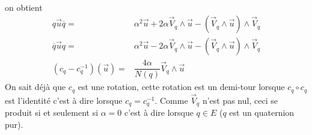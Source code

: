 \begin{enumerate}
\begin{align*}
\end{align*}
on obtient
\begin{align*}
 q\overrightarrow u \overline{q} =&
\alpha^2 \overrightarrow u + 2\alpha \overrightarrow V_q \wedge \overrightarrow u -(\overrightarrow V_q \wedge \overrightarrow u)\wedge \overrightarrow V_q \\
 \overline{q}\overrightarrow u q =&
\alpha^2 \overrightarrow u - 2\alpha \overrightarrow V_q \wedge \overrightarrow u -(\overrightarrow V_q \wedge \overrightarrow u)\wedge \overrightarrow V_q \\
(c_q-c_q^{-1})(\overrightarrow u) =& \dfrac{4\alpha}{N(q)} \overrightarrow V_q\wedge \overrightarrow u
\end{align*}
On sait déjà que $c_q$ est une rotation, cette rotation est un demi-tour lorsque $c_q\circ c_q$ est l'identité c'est à dire lorsque $c_q = c_q^{-1}$. Comme $\overrightarrow V_q$ n'est pas nul, ceci se produit si et seulement si $\alpha=0$ c'est à dire lorsque $q\in E$ ($q$ est un quaternion pur).


\end{enumerate}
